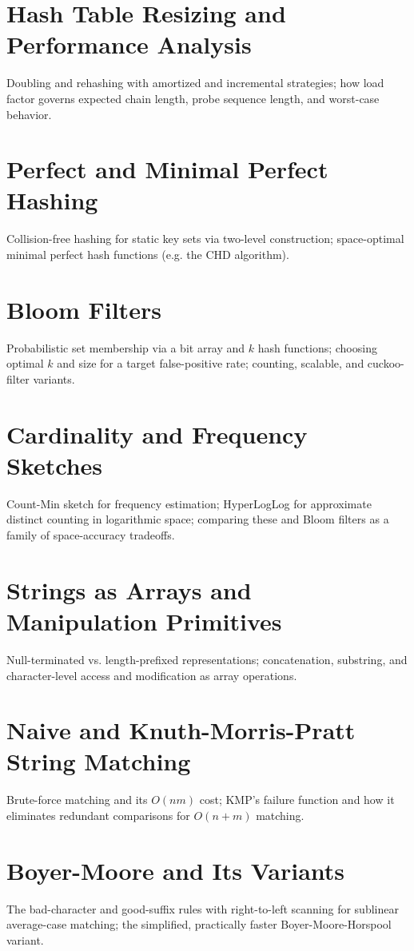 \chapter{Hash Table Resizing and Performance Analysis}
Doubling and rehashing with amortized and incremental strategies; how load factor governs expected chain length, probe sequence length, and worst-case behavior.

\chapter{Perfect and Minimal Perfect Hashing}
Collision-free hashing for static key sets via two-level construction; space-optimal minimal perfect hash functions (e.g. the CHD algorithm).

\chapter{Bloom Filters}
Probabilistic set membership via a bit array and $k$ hash functions; choosing optimal $k$ and size for a target false-positive rate; counting, scalable, and cuckoo-filter variants.

\chapter{Cardinality and Frequency Sketches}
Count-Min sketch for frequency estimation; HyperLogLog for approximate distinct counting in logarithmic space; comparing these and Bloom filters as a family of space-accuracy tradeoffs.

\chapter{Strings as Arrays and Manipulation Primitives}
Null-terminated vs. length-prefixed representations; concatenation, substring, and character-level access and modification as array operations.

\chapter{Naive and Knuth-Morris-Pratt String Matching}
Brute-force matching and its $O(nm)$ cost; KMP's failure function and how it eliminates redundant comparisons for $O(n+m)$ matching.

\chapter{Boyer-Moore and Its Variants}
The bad-character and good-suffix rules with right-to-left scanning for sublinear average-case matching; the simplified, practically faster Boyer-Moore-Horspool variant.

